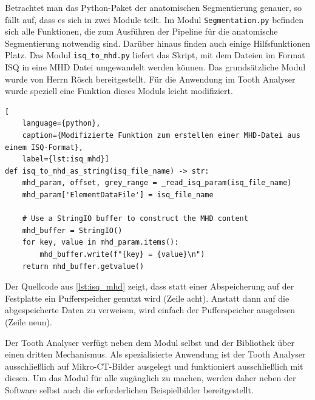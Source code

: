 Betrachtet man das Python-Paket der anatomischen Segmentierung genauer, so fällt
auf, dass es sich in zwei Module teilt. Im Modul \texttt{Segmentation.py}
befinden sich alle Funktionen, die zum Ausführen der Pipeline für die anatomische
Segmentierung notwendig sind. Darüber hinaus finden auch einige Hilfsfunktionen
Platz. Das Modul \texttt{isq\_to\_mhd.py} liefert das Skript, mit dem Dateien im
Format \ac{ISQ} in eine \ac{MHD} Datei umgewandelt werden können. Das
grundsätzliche Modul wurde von Herrn Rösch bereitgestellt. Für die Anwendung im Tooth
Analyser wurde speziell eine Funktion dieses Moduls leicht modifiziert.

\begin{lstlisting}[
    language={python},
    caption={Modifizierte Funktion zum erstellen einer MHD-Datei aus einem ISQ-Format},
    label={lst:isq_mhd}]
def isq_to_mhd_as_string(isq_file_name) -> str:
    mhd_param, offset, grey_range = _read_isq_param(isq_file_name)
    mhd_param['ElementDataFile'] = isq_file_name

    # Use a StringIO buffer to construct the MHD content
    mhd_buffer = StringIO()
    for key, value in mhd_param.items():
        mhd_buffer.write(f"{key} = {value}\n")
    return mhd_buffer.getvalue()
\end{lstlisting}

Der Quellcode aus \ref{lst:isq_mhd} zeigt, dass statt einer Abspeicherung auf der
Festplatte ein Pufferspeicher genutzt wird (Zeile acht). Anstatt dann auf die
abgespeicherte Daten zu verweisen, wird einfach der Pufferspeicher ausgelesen (Zeile
neun).

Der Tooth Analyser verfügt neben dem Modul selbst und der Bibliothek über einen dritten
Mechanismus. Als spezialisierte Anwendung ist der Tooth Analyser ausschließlich
auf Mikro-CT-Bilder ausgelegt und funktioniert ausschließlich mit diesen. Um das
Modul für alle zugänglich zu machen, werden daher neben der Software selbst auch
die erforderlichen Beispielbilder bereitgestellt.


